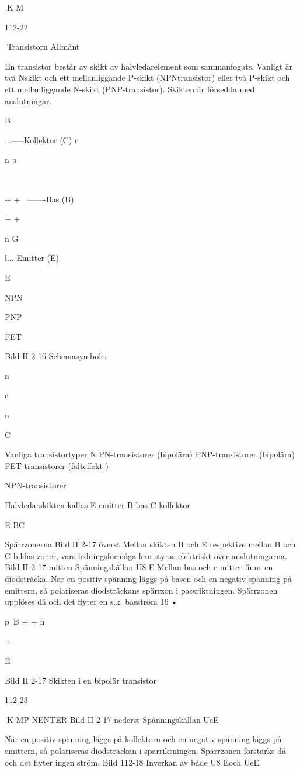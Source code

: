 \documentclass[a4paper,twoside,twocolumn,openright]{book}
\begin{document}
{{{K M

112-22

Transistorn
Allmänt

En transistor består av skikt av halvledarelement som sammanfogats. Vanligt är två Nskikt och ett mellanliggande P-skikt (NPNtransistor) eller två P-skikt och ett mellanliggande N-skikt (PNP-transistor). Skikten är
försedda med anslutningar.

B~

...-----Kollektor
(C)
r

n
p

~

+ + ~-------Bas (B)

+ +
~

n
G

l... Emitter (E)

E

NPN

PNP

FET

Bild II 2-16 Schemasymboler

n

c

n

C

Vanliga transistortyper
N PN-transistorer (bipolära)
PNP-transistorer (bipolära)
FET-transistorer (fälteffekt-)

NPN-transistorer

Halvledarskikten kallas
E emitter
B bas
C kollektor

E BC

Spärrzonerna
Bild II 2-17 överst
Mellan skikten B och E respektive mellan B
och C bildas zoner, vars ledningsförmåga
kan styras elektriskt över anslutningarna.
Bild II 2-17 mitten
Spänningskällan U8 E
Mellan bas och e mitter finns en diodsträcka.
När en positiv spänning läggs på basen och
en negativ spänning på emittern, så polariseras diodsträckans spärrzon i passriktningen. Spärrzonen upplöses då och det flyter en
s.k. basström 16 •

p~B
+ +
n

+

E

Bild II 2-17 Skikten i en bipolär transistor

112-23

K MP NENTER
Bild II 2-17 nederst
Spänningskällan UeE

När en positiv spänning läggs på kollektorn
och en negativ spänning läggs på emittern,
så polariseras diodsträckan i spärriktningen.
Spärrzonen förstärks då och det flyter ingen
ström.
Bild 112-18
Inverkan av både U8 Eoch UeE

}}}
\end{document}

